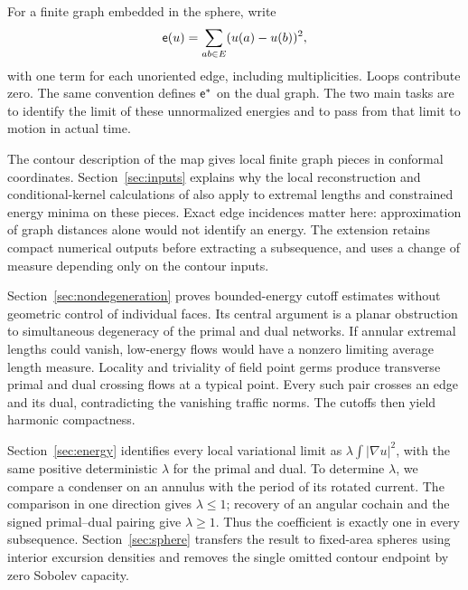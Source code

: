 For a finite graph embedded in the sphere, write
\begin{equation}\label{eq:network-energy}
 \mathsf e(u)=\sum_{ab\in E}(u(a)-u(b))^2,
\end{equation}
with one term for each unoriented edge, including multiplicities. Loops
contribute zero. The same convention defines $\mathsf e^{*}$ on the dual graph.
The two main tasks are to identify the limit of these unnormalized
energies and to pass from that limit to motion in actual time.

The contour description of the map gives local finite graph pieces in
conformal coordinates. Section~\ref{sec:inputs} explains why the local
reconstruction and conditional-kernel calculations of \cite{MetricMaps}
also apply to extremal lengths and constrained energy minima on these
pieces. Exact edge incidences matter here: approximation of graph
distances alone would not identify an energy. The extension retains
compact numerical outputs before extracting a subsequence, and uses a
change of measure depending only on the contour inputs.

Section~\ref{sec:nondegeneration} proves bounded-energy cutoff estimates
without geometric control of individual faces. Its central argument is
a planar obstruction to simultaneous degeneracy of the primal and dual
networks. If annular extremal lengths could vanish, low-energy flows
would have a nonzero limiting average length measure. Locality and
triviality of field point germs produce transverse primal and dual
crossing flows at a typical point. Every such pair crosses an edge and
its dual, contradicting the vanishing traffic norms. The cutoffs then
yield harmonic compactness.

Section~\ref{sec:energy} identifies every local variational limit as
$\lambda\int|\nabla u|^2$, with the same positive deterministic $\lambda$
for the primal and dual. To determine $\lambda$, we compare a condenser
on an annulus with the period of its rotated current. The comparison in
one direction gives $\lambda\le1$; recovery of an angular cochain and
the signed primal--dual pairing give $\lambda\ge1$. Thus the coefficient
is exactly one in every subsequence. Section~\ref{sec:sphere} transfers
the result to fixed-area spheres using interior excursion densities and
removes the single omitted contour endpoint by zero Sobolev capacity.


